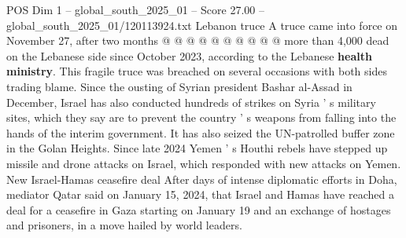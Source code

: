 \begin{textsample}{POS Dim 1 – global\_south\_2025\_01 – Score 27.00 – global\_south\_2025\_01/120113924.txt}
Lebanon truce A truce came into force on November 27, after two months @ @ @ @ @ @ @ @ @ @ more than 4,000 dead on the Lebanese side since October 2023, according to the Lebanese \textbf{health} \textbf{ministry}.
This fragile truce was breached on several occasions with both sides trading blame.
Since the ousting of Syrian president Bashar al-Assad in December, Israel has also conducted hundreds of strikes on Syria ' s military sites, which they say are to prevent the country ' s weapons from falling into the hands of the interim government.
It has also seized the UN-patrolled buffer zone in the Golan Heights.
Since late 2024 Yemen ' s Houthi rebels have stepped up missile and drone attacks on Israel, which responded with new attacks on Yemen.
New Israel-Hamas ceasefire deal After days of intense diplomatic efforts in Doha, mediator Qatar said on January 15, 2024, that Israel and Hamas have reached a deal for a ceasefire in Gaza starting on January 19 and an exchange of hostages and prisoners, in a move hailed by world leaders.

\end{textsample}
